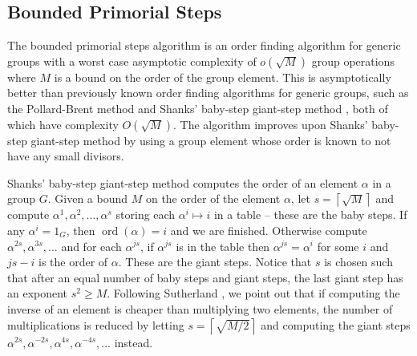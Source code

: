 \documentclass{ucalgthes1}
\theoremstyle{definition}
\DeclareMathOperator{\ord}{ord}
\newcommand{\ceil}[1]{\left\lceil #1 \right\rceil}
\begin{document}
\subsection{Bounded Primorial Steps}
\label{subsec:boundedPrimorialSteps}


The bounded primorial steps algorithm \cite{Sutherland2007} is an order finding algorithm for generic groups with a worst case asymptotic complexity of $o(\sqrt M)$ group operations where $M$ is a bound on the order of the group element.  This is asymptotically better than previously known order finding algorithms for generic groups, such as the Pollard-Brent method \cite{Brent1980} and Shanks' baby-step giant-step method \cite{Shanks1971}, both of which have complexity $O(\sqrt M)$.  The algorithm improves upon Shanks' baby-step giant-step method by using a group element whose order is known to not have any small divisors.

Shanks' baby-step giant-step method computes the order of an element $\alpha$ in a group $G$. Given a bound $M$ on the order of the element $\alpha$, let $s = \ceil{\sqrt{M}}$ and compute $\alpha^1, \alpha^2, ..., \alpha^s$ storing each $\alpha^i \mapsto i$ in a table -- these are the baby steps.  If any $\alpha^i = 1_G$, then $\ord(\alpha) = i$ and we are finished.  Otherwise compute $\alpha^{2s}, \alpha^{3s}, ...$ and for each $\alpha^{js}$, if $\alpha^{js}$ is in the table then $\alpha^{js} = \alpha^i$ for some $i$ and $js - i$ is the order of $\alpha$.  These are the giant steps.  Notice that $s$ is chosen such that after an equal number of baby steps and giant steps, the last giant step has an exponent $s^2 \ge M$.  Following Sutherland \cite[p.50]{Sutherland2007}, we point out that if computing the inverse of an element is cheaper than multiplying two elements, the number of multiplications is reduced by letting $s = \ceil{\sqrt{M/2}}$ and computing the giant steps $\alpha^{2s}, \alpha^{-2s}, \alpha^{4s}, \alpha^{-4s}, ...$ instead.  



\end{document}
